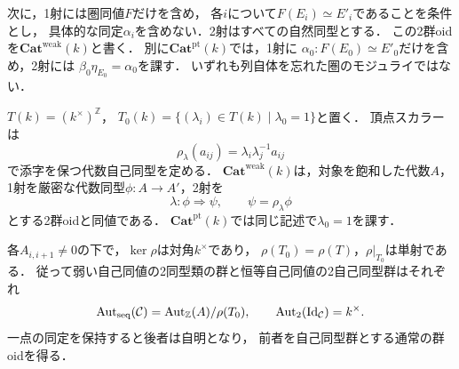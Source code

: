次に，1射には圏同値$F$だけを含め，
各$i$について$F(E_i)\simeq E'_i$であることを条件とし，
具体的な同定$\alpha_i$を含めない．2射はすべての自然同型とする．
この2群oidを$\mathbf{Cat}^{\mathrm{weak}}(k)$と書く．
別に$\mathbf{Cat}^{\mathrm{pt}}(k)$では，1射に
$\alpha_0:F(E_0)\simeq E'_0$だけを含め，2射には
$\beta_0\eta_{E_0}=\alpha_0$を課す．
いずれも列自体を忘れた圏のモジュライではない．

\begin{proposition}[スカラーgaugeの正確な作用]
\label{prop:categorical-scalar-gauge}
$T(k)=(k^\times)^{\mathbb Z}$，
$T_0(k)=\{(\lambda_i)\in T(k)\mid\lambda_0=1\}$と置く．
頂点スカラーは
\begin{equation}\label{eq:categorical-vertex-gauge}
 \rho_\lambda(a_{ij})=\lambda_i\lambda_j^{-1}a_{ij}
\end{equation}
で添字を保つ代数自己同型を定める．
$\mathbf{Cat}^{\mathrm{weak}}(k)$は，対象を飽和した代数$A$，
1射を厳密な代数同型$\phi:A\to A'$，2射を
\begin{equation}\label{eq:categorical-gauge-two-arrow}
 \lambda:\phi\Rightarrow\psi,
 \qquad \psi=\rho_\lambda\phi
\end{equation}
とする2群oidと同値である．
$\mathbf{Cat}^{\mathrm{pt}}(k)$では同じ記述で$\lambda_0=1$を課す．

各$A_{i,i+1}\ne0$の下で，$\ker\rho$は対角$k^\times$であり，
$\rho(T_0)=\rho(T)$，$\rho|_{T_0}$は単射である．
従って弱い自己同値の2同型類の群と恒等自己同値の2自己同型群はそれぞれ
\begin{equation}\label{eq:categorical-weak-inertia}
 \operatorname{Aut}_{\mathrm{seq}}(\mathcal C)
   =\operatorname{Aut}_{\mathbb Z}(A)/\rho(T_0),
 \qquad
 \operatorname{Aut}_2(\operatorname{Id}_{\mathcal C})=k^\times.
\end{equation}
一点の同定を保持すると後者は自明となり，
前者を自己同型群とする通常の群oidを得る．
\end{proposition}

